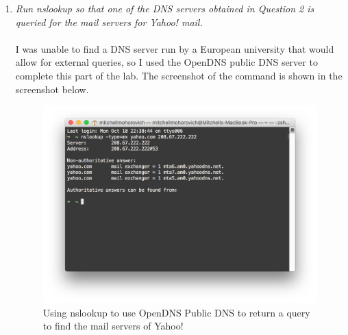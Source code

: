 \documentclass[12pt]{article}
\begin{document}
\begin{enumerate}
	\item{\textit{Run nslookup so that one of the DNS servers obtained in Question 2 is queried for the mail servers for Yahoo! mail.}}\\ \\
		I was unable to find a DNS server run by a European university that would allow for external queries, so I used the OpenDNS public DNS server to complete this part of the lab. The screenshot of the command is shown in the screenshot below.

		\begin{figure}[H]
			\includegraphics[width=1\textwidth,center]{google_dns}%
			\caption{Using nslookup to use OpenDNS Public DNS to return a query to find the mail servers of Yahoo!}
		\end{figure}

\end{enumerate}
\end{document}
